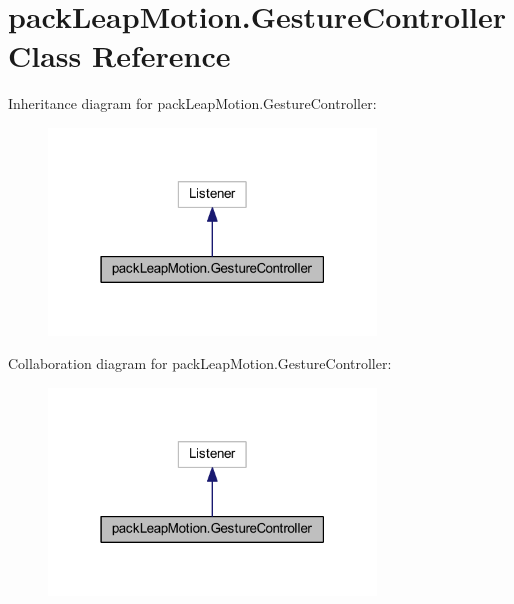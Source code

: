 \hypertarget{classpack_leap_motion_1_1_gesture_controller}{}\section{pack\+Leap\+Motion.\+Gesture\+Controller Class Reference}
\label{classpack_leap_motion_1_1_gesture_controller}


Inheritance diagram for pack\+Leap\+Motion.\+Gesture\+Controller\+:
\nopagebreak
\begin{figure}[H]
\begin{center}
\leavevmode
\includegraphics[width=247pt]{classpack_leap_motion_1_1_gesture_controller__inherit__graph}
\end{center}
\end{figure}


Collaboration diagram for pack\+Leap\+Motion.\+Gesture\+Controller\+:
\nopagebreak
\begin{figure}[H]
\begin{center}
\leavevmode
\includegraphics[width=247pt]{classpack_leap_motion_1_1_gesture_controller__coll__graph}
\end{center}
\end{figure}
